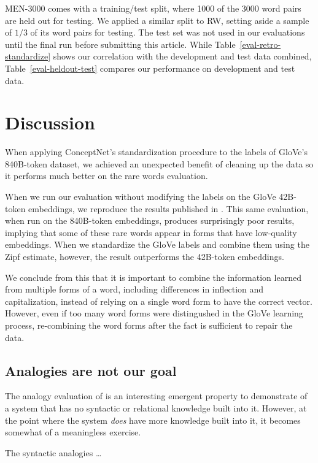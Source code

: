 \documentclass[letterpaper]{article}
\begin{document}
MEN-3000
comes with a training/test split, where 1000 of the 3000 word pairs are held
out for testing. We applied a similar split to RW, setting aside a sample
of $1/3$ of its word pairs for testing. The test set was not used in our
evaluations until the final run before submitting this article. While
Table~\ref{eval-retro-standardize} shows our correlation with the development
and test data combined, Table~\ref{eval-heldout-test} compares our performance
on development and test data.



\section{Discussion}

When applying ConceptNet's standardization procedure to the labels of GloVe's
840B-token dataset, we achieved an unexpected benefit of cleaning up the data
so it performs much better on the rare words evaluation.

When we run our evaluation without modifying the labels on the GloVe 42B-token
embeddings, we reproduce the results published in \cite{pennington2014glove}.
This same evaluation, when run on the 840B-token embeddings, produces
surprisingly poor results, implying that some of these rare words appear in
forms that have low-quality embeddings. When we standardize the GloVe labels
and combine them using the Zipf estimate, however, the result outperforms the
42B-token embeddings.

We conclude from this that it is important to combine the information learned
from multiple forms of a word, including differences in inflection and
capitalization, instead of relying on a single word form to have the correct
vector. However, even if too many word forms were distingushed in the GloVe
learning process, re-combining the word forms after the fact is sufficient to
repair the data.

\subsection{Analogies are not our goal}
\label{analogies-meh}

The analogy evaluation of \cite{mikolov2013word2vec} is an interesting
emergent property to demonstrate of a system that has no syntactic or
relational knowledge built into it. However, at the point where the system
{\em does} have more knowledge built into it, it becomes somewhat of
a meaningless exercise.

The syntactic analogies \ldots

\begin{CJK*}{UTF8}{min}

\end{CJK*}
\end{document}
